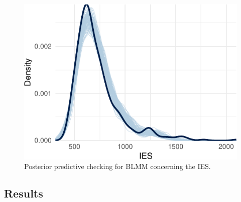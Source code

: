 \documentclass[
  11pt,
  english,
  ,doc,floatsintext]{apa6}
\begin{document}
\begin{figure}[!h]

{\centering \includegraphics[width=\textwidth]{supplementary_materials_files/figure-latex/ppcheckIBMf-1} 

}

\caption{Posterior predictive checking for BLMM concerning the IES.}\label{fig:ppcheckIBMf}
\end{figure}

\newpage

\hypertarget{results-1}{%
\subsection{Results}\label{results-1}}
\end{document}
